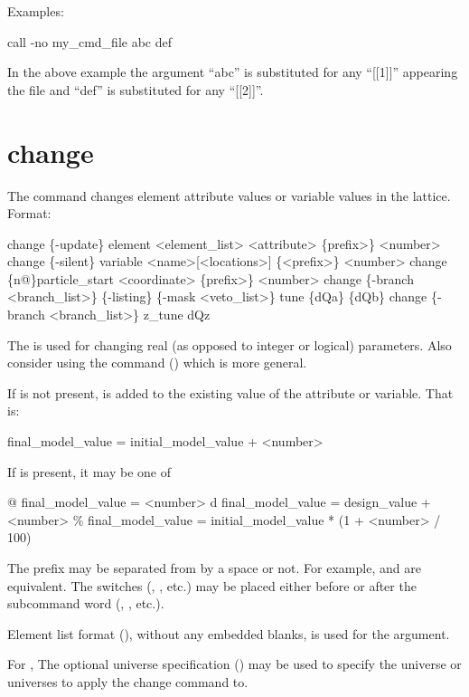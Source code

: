 Examples:
\begin{example}
    call -no my_cmd_file abc def 
\end{example}
In the above example the argument ``abc'' is substituted for any ``[[1]]'' appearing the
file and ``def'' is substituted for any ``[[2]]''.  \Newline

\section{change}
\label{s:change}

The  command changes element attribute values or variable values in the 
lattice. Format:
\begin{example}
  change \{-update\} element <element_list> <attribute> \{prefix>\} <number>
  change \{-silent\} variable <name>[<locations>] \{<prefix>\} <number>
  change \{n@\}particle_start <coordinate> \{prefix>\} <number>
  change \{-branch <branch_list>\} \{-listing\} \{-mask <veto_list>\} tune \{dQa\} \{dQb\}
  change \{-branch <branch_list>\} z_tune dQz
\end{example}

\vskip 10pt 
The  is used for changing real (as opposed to integer or logical) parameters. Also
consider using the  command () which is more general.

If  is not present,  is added to the existing value
of the attribute or variable. That is:
\begin{example}
  final_model_value = initial_model_value + <number>
\end{example}
If  is present, it may be one of
\begin{example}
  @       final_model_value = <number>
  d       final_model_value = design_value + <number>
  \%       final_model_value = initial_model_value * (1 + <number> / 100)
\end{example}
The prefix may be separated from  by a space or not. For example,  and
 are equivalent. The switches (, , etc.) may be placed either
before or after the subcommand word (, , etc.).

Element list format (), without any embedded blanks, is used for
the  argument.

For , The optional  universe specification () may
be used to specify the universe or universes to apply the change command to.

